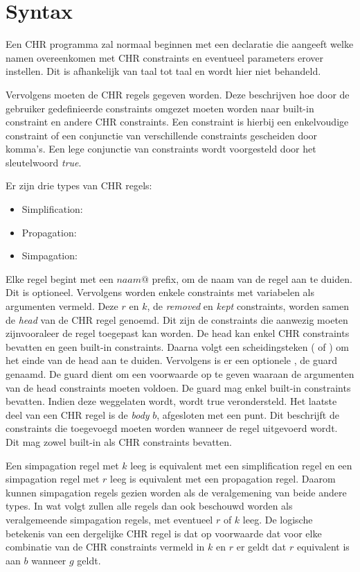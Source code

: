 \section{Syntax} \label{sec:chr-syntax}

Een CHR programma zal normaal beginnen met een declaratie die aangeeft welke namen overeenkomen met CHR constraints en eventueel parameters erover instellen. Dit is afhankelijk van taal tot taal en wordt hier niet behandeld.

Vervolgens moeten de CHR regels gegeven worden. Deze beschrijven hoe door de gebruiker gedefinieerde constraints omgezet moeten worden naar built-in constraint en andere CHR constraints. Een constraint is hierbij een enkelvoudige constraint of een conjunctie van verschillende constraints gescheiden door komma's. Een lege conjunctie van constraints wordt voorgesteld door het sleutelwoord {\em true}. 

Er zijn drie types van CHR regels: \begin{itemize}
\item Simplification: 
\item Propagation: 
\item Simpagation: 
\end{itemize}
Elke regel begint met een $ naam @ $ prefix, om de naam van de regel aan te duiden. Dit is optioneel. Vervolgens worden enkele constraints met variabelen als argumenten vermeld. Deze $r$ en $k$, de {\em removed} en {\em kept} constraints, worden samen de {\em head} van de CHR regel genoemd. Dit zijn de constraints die aanwezig moeten zijnvooraleer de regel toegepast kan worden. De head kan enkel CHR constraints bevatten en geen built-in constraints. Daarna volgt een scheidingsteken (\code{<=>} of \code{==>}) om het einde van de head aan te duiden. Vervolgens is er een optionele , de guard genaamd. De guard dient om een voorwaarde op te geven waaraan de argumenten van de head constraints moeten voldoen. De guard mag enkel built-in constraints bevatten. Indien deze weggelaten wordt, wordt true verondersteld. Het laatste deel van een CHR regel is de {\em body} $b$, afgesloten met een punt. Dit beschrijft de constraints die toegevoegd moeten worden wanneer de regel uitgevoerd wordt. Dit mag zowel built-in als CHR constraints bevatten.

Een simpagation regel met $k$ leeg is equivalent met een simplification regel en een simpagation regel met $r$ leeg is equivalent met een propagation regel. Daarom kunnen simpagation regels gezien worden als de veralgemening van beide andere types. In wat volgt zullen alle regels dan ook beschouwd worden als veralgemeende simpagation regels, met eventueel $r$ of $k$ leeg. De logische betekenis van een dergelijke CHR regel is dat op voorwaarde dat voor elke combinatie van de CHR constraints vermeld in $k$ en $r$ er geldt dat $r$ equivalent is aan $b$ wanneer $g$ geldt.

